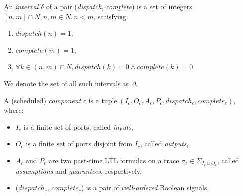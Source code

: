 An \emph{interval} $\delta$ of a pair (\emph{dispatch}, \emph{complete}) is a set of integers $[n, m] \cap N, n,m \in N, n < m$, satisfying:

\begin{enumerate}
	\item $ dispatch(n) = 1 $, 
	\item $ complete(m) = 1 $, 
	\item $ \forall k\in (n, m) \cap N, dispatch(k)=0 \wedge complete(k)=0 $.
\end{enumerate}

We denote the set of all such intervals as $\Delta$.

A (scheduled) \emph{component} $c$ is a tuple $(I_c, O_c, A_c, P_c, dispatch_c, complete_c)$, where: 

\begin{itemize}
    	\item $I_c$ is a finite set of ports, called \emph{inputs},
    	\item $O_c$ is a finite set of ports disjoint from $I_c$, called \emph{outputs},
	\item $A_c$ and $P_c$ are two past-time LTL formulas on a trace $\sigma_c \in \Sigma_{I_c \cup O_c}$, called \emph{assumptions} and \emph{guarantees}, respectively,	
    	\item ($dispatch_c$, $complete_c$) is a pair of \emph{well-ordered} Boolean signals.
\end{itemize}




